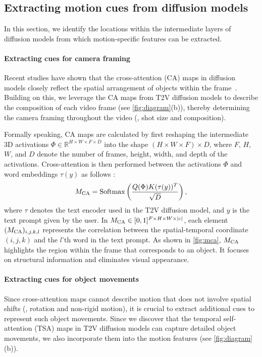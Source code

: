 \subsection{Extracting motion cues from diffusion models}

In this section, we identify the locations within the intermediate layers of diffusion models from which motion-specific features can be extracted.

\paragraph{Extracting cues for camera framing}
Recent studies have shown that the cross-attention (CA) maps in diffusion models closely reflect the spatial arrangement of objects within the frame~\cite{boxdiff, db, trailblazer, peekaboo, direct}. Building on this, we leverage the CA maps from T2V diffusion models to describe the composition of each video frame (see \cref{fig:diagram}(b)), thereby determining the camera framing throughout the video (\eg, shot size and composition).

Formally speaking, CA maps are calculated by first reshaping the intermediate 3D activations $\Phi\in\mathbb{R}^{H\times W\times F\times D}$ into the shape $(H\times W\times F)\times D$, where $F$, $H$, $W$, and $D$ denote the number of frames, height, width, and depth of the activations. Cross-attention is then performed between the activations $\Phi$ and word embeddings $\tau(y)$ as follows :
\begin{equation}
M_{{\rm CA}}=\mathrm{Softmax}\left(\frac{Q(\Phi)K(\tau(y))^T}{\sqrt{D}}\right)
\label{eq:features},
\end{equation}
where $\tau$ denotes the text encoder used in the T2V diffusion model, and $y$ is the text prompt given by the user. In $M_{{\rm CA}}\in\mathbb[0,1]^{F\times H\times W \times |c|}$, each element $(M_{{\rm CA}})_{i,j,k,l}$ represents the correlation between the spatial-temporal coordinate $(i,j,k)$ and the $l$'th word in the text prompt. As shown in \cref{fig:mca}, $M_{{\rm CA}}$ highlights the region within the frame that corresponds to an object. It focuses on structural information and eliminates visual appearance.

\paragraph{Extracting cues for object movements}
Since cross-attention maps cannot describe motion that does not involve spatial shifts (\eg, rotation and non-rigid motion), it is crucial to extract additional cues to represent such object movements. Since we discover that the temporal self-attention (TSA) maps in T2V diffusion models can capture detailed object movements, we also incorporate them into the motion features (see \cref{fig:diagram}(b)).

